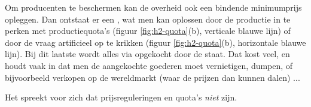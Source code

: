 Om producenten te beschermen kan de overheid ook een bindende minimumprijs opleggen. Dan ontstaat er een , wat men kan oplossen door de productie in te perken met productiequota's (figuur \ref{fig:h2-quota}(b), verticale blauwe lijn) of door de vraag artificieel op te krikken (figuur \ref{fig:h2-quota}(b), horizontale blauwe lijn). Bij dit laatste wordt alles via  opgekocht door de staat. Dat kost veel, en houdt vaak in dat men de aangekochte goederen moet vernietigen, dumpen, of bijvoorbeeld verkopen op de wereldmarkt (waar de prijzen dan kunnen dalen) ...\\

\par Het spreekt voor zich dat prijsreguleringen en quota's \textit{niet}  zijn.